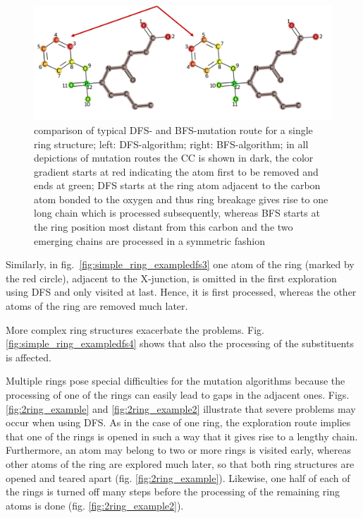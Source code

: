 \begin{figure}
\includegraphics[scale=1.4]{simple_ring_exampledfs.png}

\caption{comparison of typical DFS- and BFS-mutation route for a single ring structure; left: DFS-algorithm; right: BFS-algorithm; in all depictions of mutation routes the CC is shown in dark, the color gradient starts at red indicating the atom first to be removed and ends at green; DFS
starts at the ring atom adjacent to the carbon atom bonded to the oxygen and thus ring breakage gives rise to one long
chain which is processed subsequently, whereas BFS starts at the ring position most distant from this carbon and the two emerging chains are processed in a symmetric fashion
}
\label{fig:comparison_dfs_bfs}
\end{figure}



Similarly, in fig.~\ref{fig:simple_ring_exampledfs3} one atom of the ring (marked by the red circle), adjacent to the X-junction, is omitted in the first exploration using DFS and only visited at last. Hence, it is first processed, whereas the other atoms of the ring are removed much later.

More complex ring structures exacerbate the problems. Fig. \ref{fig:simple_ring_exampledfs4} shows that also the processing of the substituents is affected.

Multiple rings pose special difficulties for the mutation algorithms because
the processing of one of the rings can easily lead to gaps in the adjacent
ones. Figs. \ref{fig:2ring_example} and  \ref{fig:2ring_example2} illustrate that severe problems may occur when using DFS.
As in the case of one ring, the exploration route implies that one
of the rings is opened in such a way that it gives rise to a lengthy chain.
Furthermore, an atom may belong to two or more rings is visited early, whereas other atoms of the ring are explored much later, so that both ring structures are opened
and teared apart (fig. \ref{fig:2ring_example}). Likewise, one half of each of the
rings is turned off many steps before the processing of the remaining ring atoms is done (fig. \ref{fig:2ring_example2}). 

